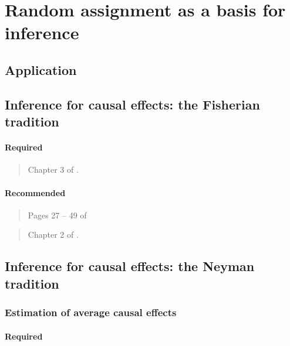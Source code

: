 \documentclass[12pt]{article}
\begin{document}
\section{Random assignment as a basis for inference}

\subsection*{Application}

\begin{verse}  \end{verse}

\subsection{Inference for causal effects: the Fisherian tradition}

\paragraph*{Required}

\begin{verse}
  Chapter 3 of .
\end{verse}

\paragraph*{Recommended}

\begin{verse}
  Pages 27 -- 49 of 
\end{verse}

\begin{verse}
  Chapter 2 of .
\end{verse}

\subsection{Inference for causal effects: the Neyman tradition}

\subsubsection{Estimation of average causal effects}

\paragraph*{Required}
\end{document}
